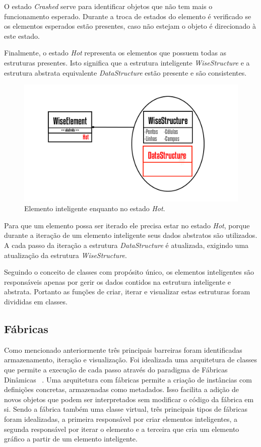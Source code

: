 \documentclass[a4paper,12pt]{monografia}
\theoremstyle{plain}
\theoremstyle{definition}
\theoremstyle{remark}
\begin{document}
O estado \textit{Crashed} serve para identificar objetos que não tem mais o funcionamento esperado. Durante a troca de estados do elemento é verificado se os elementos esperados estão presentes, caso não estejam o objeto é direcionado à este estado.

Finalmente, o estado \textit{Hot} representa os elementos que possuem todas as estruturas presentes. Isto significa que a estrutura inteligente \textit{WiseStructure} e a estrutura abstrata equivalente \textit{DataStructure} estão presente e são consistentes.

\begin{figure}[!htbp]
	\centering
	\includegraphics[scale=1]{Figures/WiseElementHot.png}
	\caption{Elemento inteligente enquanto no estado \textit{Hot}.}
	\label{fig6:wiseelementhot}
\end{figure}

Para que um elemento possa ser iterado ele precisa estar no estado \textit{Hot}, porque durante a iteração de um elemento inteligente seus dados abstratos são utilizados. A cada passo da iteração a estrutura \textit{DataStructure} é atualizada, exigindo uma atualização da estrutura \textit{WiseStructure}.

Seguindo o conceito de classes com propósito único, os elementos inteligentes são responsáveis apenas por gerir os dados contidos na estrutura inteligente e abstrata. Portanto as funções de criar, iterar e visualizar estas estruturas foram divididas em classes.

\subsection{Fábricas}\label{sec:fabricas} 
 
Como mencionado anteriormente três principais barreiras foram identificadas armazenamento, iteração e visualização. Foi idealizada uma arquitetura de classes que permite a execução de cada passo através do paradigma de Fábricas Dinâmicas~ \cite{factorypattern}. Uma arquitetura com fábricas permite a criação de instâncias com definições concretas, armazenadas como metadados. Isso facilita a adição de novos objetos que podem ser interpretados sem modificar o código da fábrica em si. Sendo a fábrica também uma classe virtual, três principais tipos de fábricas foram idealizadas, a primeira responsável por criar elementos inteligentes, a  segunda responsável por iterar o elemento e a terceira que cria um elemento gráfico a partir de um elemento inteligente.
\end{document}
